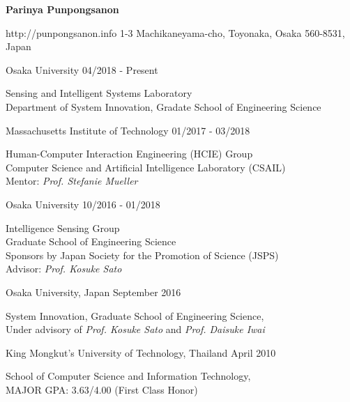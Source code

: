 \documentclass[11pt]{article} %
\begin{document}
{{\Huge \bf Parinya Punpongsanon}}
\smallskip

        {http://punpongsanon.info}
        {1-3 Machikaneyama-cho, Toyonaka, Osaka 560-8531, Japan}


\begin{description}
	\squish
	{Osaka University}
	{04/2018 - Present}
	
	Sensing and Intelligent Systems Laboratory\\
	Department of System Innovation, Gradate School of Engineering Science
	
	{Massachusetts Institute of Technology}
	{01/2017 - 03/2018}
	
	Human-Computer Interaction Engineering (HCIE) Group\\
	Computer Science and Artificial Intelligence Laboratory (CSAIL)\\
	Mentor: \textit{Prof. Stefanie Mueller}
	
	{Osaka University}
	{10/2016 - 01/2018}
	
	Intelligence Sensing Group\\
	Graduate School of Engineering Science\\
	Sponsors by Japan Society for the Promotion of Science (JSPS)\\
	Advisor: \textit{Prof. Kosuke Sato}
	
\end{description}


\begin{description}
	\squish
	{Osaka University, Japan}
	{September 2016}
	
	System Innovation, Graduate School of Engineering Science,\\
	Under advisory of \textit{Prof. Kosuke Sato} and \textit{Prof. Daisuke Iwai}
	
	{King Mongkut's University of Technology, Thailand}
	{April 2010}
	
	School of Computer Science and Information Technology,\\
	MAJOR GPA: 3.63/4.00 (First Class Honor)
	
\end{description}
\end{document}
